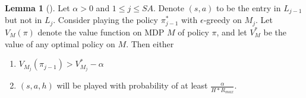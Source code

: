 \documentclass[12pt, letterpaper]{article}
\theoremstyle{definition}
\newtheorem*{lemma}{Lemma}
\theoremstyle{remark}
\begin{document}
\begin{lemma}[]
    Let \(\alpha > 0\) and \(1 \leq j \leq SA\). Denote \((s, a)\) to be the entry in \(L_{j-1}\) but not in \(L_{j}\). Consider playing the policy \(\pi_{j-1}^*\) with \(\epsilon\)-greedy on \(M_j\). Let \(V_{M}(\pi)\) denote the value function on MDP \(M\) of policy \(\pi\), and let \(V^*_{M}\) be the value of any optimal policy on \(M\). Then either

    \begin{enumerate}
        \item \(V_{M_j} (\pi_{j-1}) > V^*_{M_j} - \alpha\)
        \item \((s, a, h)\) will be played with probability of at least \(\frac{\alpha}{H*R_{max}}\).
    \end{enumerate}
    
\end{lemma}
\end{document}
